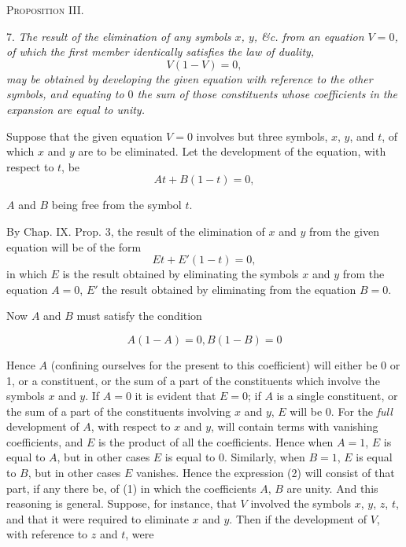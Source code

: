 \documentclass[oneside]{book}
\begin{document}
\begin{center}
\textsc{Proposition III.}
\end{center}

7. \textit{The result of the elimination of any symbols $x$, $y$, \&c. from
an equation $V=0$, of which the first member identically satisfies
the law of duality,
\[
V(1-V) = 0,
\]
may be obtained by developing the given equation with reference to
the other symbols, and equating to $0$ the sum of those constituents
whose coefficients in the expansion are equal to unity.}

Suppose that the given equation $V = 0$ involves but three
symbols, $x$, $y$, and $t$, of which $x$ and $y$ are to be eliminated. Let
the development of the equation, with respect to $t$, be
\setcounter{equation}{0}
\begin{equation}
At + B(1-t)=0,
\end{equation}

$A$ and $B$ being free from the symbol $t$.

By Chap. IX. Prop. 3, the result of the elimination of $x$ and $y$
from the given equation will be of the form
\begin{equation}
Et+ E'(1 -t) = 0,
\end{equation}
in which $E$ is the result obtained by eliminating the symbols $x$
and $y$ from the equation $A = 0$, $E'$ the result obtained by eliminating
from the equation $B = 0$.

Now $A$ and $B$ must satisfy the condition

\[
A (1 - A) = 0, B(1 - B) = 0
\]

Hence $A$ (confining ourselves for the present to this coefficient)
will either be 0 or 1, or a constituent, or the sum of a part of the
constituents which involve the symbols $x$ and $y$. If $A = 0$ it is
evident that $E = 0$; if $A$ is a single constituent, or the sum of a
part of the constituents involving $x$ and $y$, $E$ will be 0. For the
\textit{full} development of $A$, with respect to $x$ and $y$, will contain terms
with vanishing coefficients, and $E$ is the product of all the coefficients.
Hence when $A = 1$, $E$ is equal to $A$, but in other cases
$E$ is equal to 0. Similarly, when $B = 1$, $E$ is equal to $B$, but in
other cases $E$ vanishes. Hence the expression (2) will consist of
that part, if any there be, of (1) in which the coefficients $A$, $B$
are unity. And this reasoning is general. Suppose, for instance,
that $V$ involved the symbols $x$, $y$, $z$, $t$, and that it were required
to eliminate $x$ and $y$. Then if the development of $V$, with reference to $z$ and $t$, were
\end{document}
